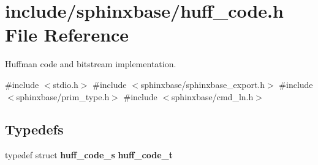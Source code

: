 \section{include/sphinxbase/huff\+\_\+code.h File Reference}
\label{huff__code_8h}


Huffman code and bitstream implementation.  


{\ttfamily \#include $<$stdio.\+h$>$}\newline
{\ttfamily \#include $<$sphinxbase/sphinxbase\+\_\+export.\+h$>$}\newline
{\ttfamily \#include $<$sphinxbase/prim\+\_\+type.\+h$>$}\newline
{\ttfamily \#include $<$sphinxbase/cmd\+\_\+ln.\+h$>$}\newline
\subsection*{Typedefs}
\begin{DoxyCompactItemize}
\item 
\mbox{\label{huff__code_8h_a99a5188e6a18682c96100cd5232af0f4}} 
typedef struct \textbf{ huff\+\_\+code\+\_\+s} {\bfseries huff\+\_\+code\+\_\+t}
\end{DoxyCompactItemize}
